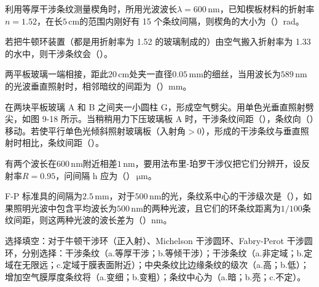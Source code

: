 \documentclass[standard, analysis, notocnum]{ExBook}
\newcommand{\answerarea}[1][8cm]{%
  \par\vspace{2mm}%
  \noindent{\color{themeColor!35}\rule{\linewidth}{0.4pt}}\par
  \noindent\begin{minipage}[t][#1][t]{\linewidth}\vspace{0pt}\end{minipage}\par
  \noindent{\color{themeColor!35}\rule{\linewidth}{0.4pt}}\par
}
\begin{document}
\begin{qitems}
\begin{bbox}
\qitem 利用等厚干涉条纹测量楔角时，所用光波波长$\lambda =600\,\mathrm{nm}$，已知楔板材料的折射率$n=1.52$，在长$5\,\mathrm{cm}$的范围内刚好有 15 个条纹间隔，则楔角的大小为（\hspace{1.6em}）rad。
\answerarea[3.5cm]
\end{bbox}
\begin{bbox}
\qitem 若把牛顿环装置（都是用折射率为 1.52 的玻璃制成的）由空气搬入折射率为 1.33 的水中，则干涉条纹会（\hspace{1.6em}）。
\answerarea[3.5cm]
\end{bbox}
\begin{bbox}
\qitem 两平板玻璃一端相接，距此$20\,\mathrm{cm}$处夹一直径$0.05\,\mathrm{mm}$的细丝，当用波长为$589\,\mathrm{nm}$的光波垂直照射时，相邻暗纹的间距为（\hspace{1.6em}）mm。
\answerarea[3.5cm]
\end{bbox}
\begin{bbox}
\qitem 在两块平板玻璃 A 和 B 之间夹一小圆柱 G，形成空气劈尖。用单色光垂直照射劈尖，如图 9-18 所示。当稍稍用力下压玻璃板 A 时，干涉条纹间距（\hspace{1.6em}），条纹向（\hspace{1.6em}）移动。若使平行单色光倾斜照射玻璃板（入射角$>0$），形成的干涉条纹与垂直照射时相比，条纹间距（\hspace{1.6em}）。
\answerarea[3.5cm]
\end{bbox}
\begin{bbox}
\qitem 有两个波长在$600\,\mathrm{nm}$附近相差$1\,\mathrm{nm}$，要用法布里-珀罗干涉仪把它们分辨开，设反射率$R=0.95$，问间隔 h 应为（\hspace{1.6em}）$\,\mathrm{\mu m}$。
\answerarea[3.5cm]
\end{bbox}
\begin{bbox}
\qitem F-P 标准具的间隔为$2.5\,\mathrm{mm}$，对于$500\,\mathrm{nm}$的光，条纹系中心的干涉级次是（\hspace{1.6em}），如果照明光波中包含平均波长为$500\,\mathrm{nm}$的两种光波，且它们的环条纹距离为$1/100$条纹间距，则这两种光波的波长差为（\hspace{1.6em}）nm。
\answerarea[3.5cm]
\end{bbox}
\begin{bbox}
\qitem 选择填空：对于牛顿干涉环（正入射）、Michelson 干涉圆环、Fabry-Perot 干涉圆环，分别选择：干涉条纹（a.等厚干涉；b.等倾干涉）；干涉条纹（a.非定域；b.定域在无限远；c.定域于膜表面附近）；中央条纹比边缘条纹的级次（a.高；b.低）；增加空气膜厚度条纹将（a.变细；b.变粗）；条纹中心为（a.暗；b.亮；c.不定）。


\end{bbox}
\end{qitems}
\end{document}
